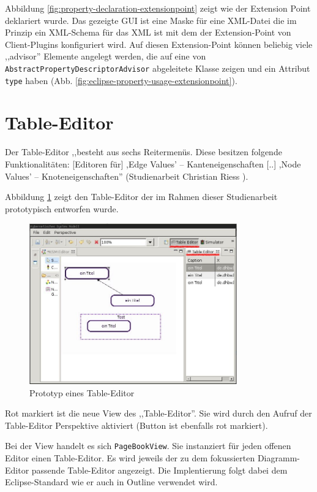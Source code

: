 \documentclass[%
12pt,titlepage,abstracton,DIV=10,BCOR=0.5cm]{scrreprt}
\begin{document}
Abbildung \ref{fig:property-declaration-extensionpoint} zeigt wie der Extension
Point deklariert wurde. Das gezeigte GUI ist eine Maske für eine XML-Datei die
im Prinzip ein XML-Schema für das XML ist mit dem der Extension-Point von
Client-Plugins konfiguriert wird. Auf diesen Extension-Point können beliebig
viele ,,advisor'' Elemente angelegt werden, die auf eine von
\texttt{Abstract\-Property\-Descriptor\-Advisor} abgeleitete Klasse zeigen und
ein Attribut \texttt{type} haben (Abb.
\ref{fig:eclipse-property-usage-extensionpoint}).


\section{Table-Editor}
Der Table-Editor ,,besteht aus sechs Reitermenüs. Diese besitzen folgende
Funktionalitäten: [Editoren für] ,Edge Values' – Kanteneigenschaften [..]
,Node Values' – Knoteneigenschaften'' (Studienarbeit Christian Riess \cite[S.
24]{riess03}).

Abbildung \ref{fig:table-editor} zeigt den Table-Editor der im Rahmen dieser
Studienarbeit prototypisch entworfen wurde.

\begin{figure}[ht]
\centering
\includegraphics[width=0.8\textwidth]{images/table-editor.jpg}
\caption{Prototyp eines Table-Editor}
\label{fig:table-editor}
\end{figure}

Rot markiert ist die neue View des ,,Table-Editor''. Sie wird durch den Aufruf
der Table-Editor Perspektive aktiviert (Button ist ebenfalls rot markiert).

Bei der View handelt es sich \texttt{PageBookView}. Sie instanziert für jeden
offenen Editor einen Table-Editor. Es wird jeweils der zu dem fokussierten
Diagramm-Editor passende Table-Editor angezeigt. Die Implentierung folgt dabei
dem Eclipse-Standard wie er auch in Outline verwendet wird.
\end{document}
